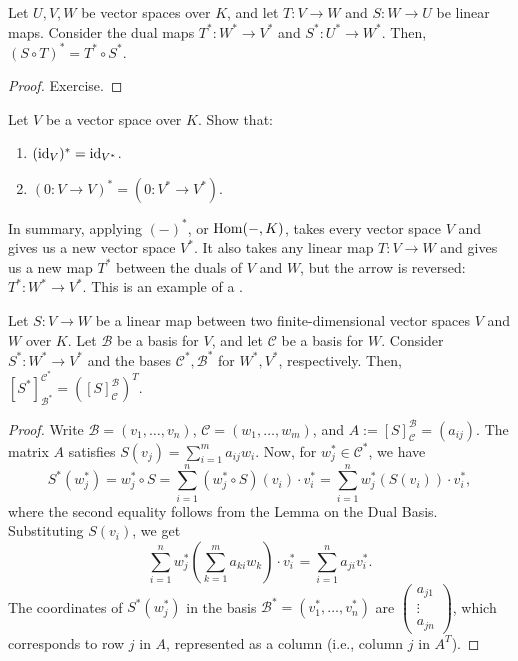 \begin{proposition}
  Let $U, V, W$ be vector spaces over $K$, and let $T \colon V \to W$ and $S \colon W \to U$ be linear maps. Consider the dual maps $T^* \colon W^* \to V^*$ and $S^* \colon U^* \to W^*$. Then, $(S \circ T)^* = T^* \circ S^*$.
\end{proposition}

\begin{proof}
  Exercise.
\end{proof}

\begin{exercise}
  Let $V$ be a vector space over $K$. Show that:
  \begin{enumerate}
    \item $(\operatorname{id}_V)^* = \operatorname{id}_{V^*}$.
    \item $(0 \colon V \to V)^* = (0 \colon V^* \to V^*)$.
  \end{enumerate}
\end{exercise}

\begin{summary}
In summary, applying $(-)^*$, or $\operatorname{Hom}(-,K)$, takes every vector space $V$ and gives us a new vector space $V^*$. It also takes any linear map $T \colon V \to W$ and gives us a new map $T^*$ between the duals of $V$ and $W$, but the arrow is reversed: $T^* \colon W^* \to V^*$. This is an example of a .
\end{summary}

\begin{lemma}
  Let $S \colon V \to W$ be a linear map between two finite-di\-men\-sional vector spaces $V$ and $W$ over $K$. Let $\mathcal{B}$ be a basis for $V$, and let $\mathcal{C}$ be a basis for $W$. Consider $S^* \colon W^* \to V^*$ and the bases $\mathcal{C}^*, \mathcal{B}^*$ for $W^*, V^*$, respectively. Then, $[S^*]_{\mathcal{B}^*}^{\mathcal{C}^*} = ([S]_{\mathcal{C}}^{\mathcal{B}})^T$.
\end{lemma}

\begin{proof}
  Write $\mathcal{B} = (v_1, \dots, v_n)$, $\mathcal{C} = (w_1, \dots, w_m)$, and $A := [S]_{\mathcal{C}}^{\mathcal{B}} = (a_{ij})$. The matrix $A$ satisfies $S(v_j) = \sum_{i=1}^m a_{ij} w_i$. Now, for $w_j^* \in \mathcal{C}^*$, we have
  \[ S^*(w_j^*) = w_j^* \circ S = \sum_{i=1}^n (w_j^* \circ S)(v_i) \cdot v_i^* = \sum_{i=1}^n w_j^*(S(v_i)) \cdot v_i^*, \]
  where the second equality follows from the Lemma on the Dual Basis. Substituting $S(v_i)$, we get
  \[ \sum_{i=1}^n w_j^*\left(\sum_{k=1}^m a_{ki} w_k\right) \cdot v_i^* = \sum_{i=1}^n a_{ji} v_i^*. \]
  The coordinates of $S^*(w_j^*)$ in the basis $\mathcal{B}^* = (v_1^*, \dots, v_n^*)$ are $\left(\begin{smallmatrix} a_{j1} \\ \vdots \\ a_{jn} \end{smallmatrix}\right)$, which corresponds to row $j$ in $A$, represented as a column (i.e., column $j$ in $A^T$). 
\end{proof}

